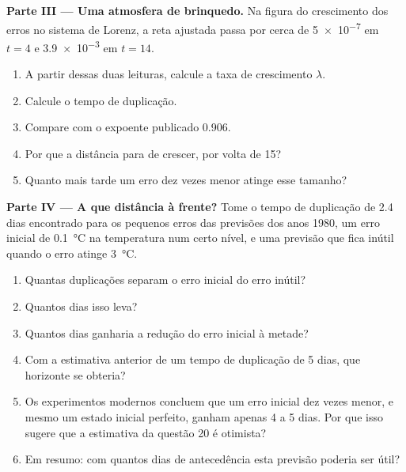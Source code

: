 \begin{problem}
\medskip\noindent\textbf{Parte III --- Uma atmosfera de brinquedo.}
Na figura do crescimento dos erros no sistema de Lorenz, a reta ajustada passa por
cerca de \num{5e-7} em $t = 4$ e \num{3.9e-3} em $t = 14$.
\begin{enumerate}[resume]
  \item A partir dessas duas leituras, calcule a taxa de crescimento $\lambda$.
  \item Calcule o tempo de duplicação.
  \item Compare com o expoente publicado 0.906.
  \item Por que a distância para de crescer, por volta de 15?
  \item Quanto mais tarde um erro dez vezes menor atinge esse tamanho?
\end{enumerate}

\medskip\noindent\textbf{Parte IV --- A que distância à frente?}
Tome o tempo de duplicação de 2.4 dias encontrado para os pequenos erros das previsões dos anos 1980, um
erro inicial de \qty{0.1}{\celsius} na temperatura num certo nível, e uma previsão que fica
inútil quando o erro atinge \qty{3}{\celsius}.
\begin{enumerate}[resume]
  \item Quantas duplicações separam o erro inicial do erro inútil?
  \item Quantos dias isso leva?
  \item Quantos dias ganharia a redução do erro inicial à metade?
  \item Com a estimativa anterior de um tempo de duplicação de 5 dias, que horizonte se obteria?
  \item Os experimentos modernos concluem que um erro inicial dez vezes menor, e mesmo um estado
        inicial perfeito, ganham apenas 4 a 5 dias. Por que isso sugere que a estimativa da
        questão 20 é otimista?
  \item Em resumo: com quantos dias de antecedência esta previsão poderia ser útil?
\end{enumerate}
\end{problem}
